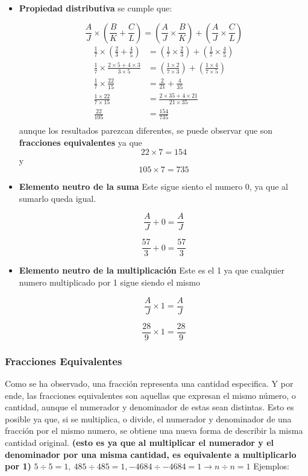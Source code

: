 \begin{itemize}
    \item \textbf{Propiedad distributiva} se cumple que:

        $$\frac{A}{J}\times\left(\frac{B}{K}+\frac{C}{L}\right)=\left(\frac{A}{J}\times\frac{B}{K}\right)+\left(\frac{A}{J}\times\frac{C}{L}\right) $$
        \begin{align*}
            \frac{1}{7}\times\left(\frac{2}{3}+\frac{4}{5}\right)&=\left(\frac{1}{7}\times\frac{2}{3}\right)+\left(\frac{1}{7}\times\frac{4}{5}\right)\\
            \frac{1}{7} \times \frac{2\times5+4\times3}{3\times5} &= \left(\frac{1\times2}{7\times3} \right)+\left(\frac{1\times4}{7\times5} \right) \\
            \frac{1}{7} \times  \frac{22}{15} &= \frac{2}{21} + \frac{4}{35} \\
            \frac{1\times22}{7\times15} &= \frac{2\times35+4\times21}{21\times35} \\
            \frac{22}{105} &= \frac{154}{735} \\
        \end{align*}
        aunque los resultados parezcan diferentes, se puede observar que son
        \textbf{fracciones equivalentes} ya que $$22\times7=154$$ y $$105\times7=735$$

    \item \textbf{Elemento neutro de la suma} Este sigue siento el numero 0, ya
        que al sumarlo queda igual.

        $$\frac{A}{J} + 0 = \frac{A}{J}$$

        $$\frac{57}{3} + 0 = \frac{57}{3}$$


    \item \textbf{Elemento neutro de la multiplicación} Este es el 1 ya que cualquier
        numero multiplicado por 1 sigue siendo el mismo

        $$\frac{A}{J} \times 1 = \frac{A}{J}$$

        $$\frac{28}{9} \times 1 = \frac{28}{9}$$

\end{itemize}


\subsubsection*{Fracciones Equivalentes}
    Como se ha observado, una fracción representa una cantidad especifica.
    Y por ende, las fracciones equivalentes son aquellas que expresan el mismo
    número, o cantidad, aunque el numerador y denominador de estas sean distintas.
    Esto es posible ya que, si se multiplica, o divide, el numerador y denominador de una
    fracción por el mismo numero, se obtiene una nueva forma de describir la
    misma cantidad original. \textbf{(esto es ya que al multiplicar el numerador y el
    denominador por una misma cantidad, es equivalente a multiplicarlo por 1)}
    $5\div5 = 1,\ 485\div485 = 1, -4684\div-4684 = 1 \rightarrow n\div n=1$
    Ejemplos:


